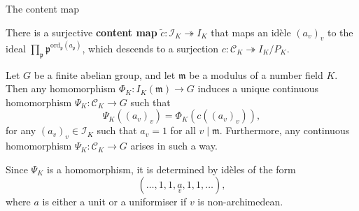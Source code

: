 \documentclass[10pt]{beamer}
\begin{document}
\begin{frame}[t]{The content map}

There is a surjective \textbf{content map} $ \widetilde{c} : \mathcal{I}_K \twoheadrightarrow I_K $ that maps an id\`ele $ (a_v)_v $ to the ideal $ \prod_\mathfrak{p} \mathfrak{p}^{\mathrm{ord}_\mathfrak{p}(a_\mathfrak{p})} $, which descends to a surjection $ c : \mathcal{C}_K \twoheadrightarrow I_K / P_K $.

\pause

\begin{lemma}
Let $ G $ be a finite abelian group, and let $ \mathfrak{m} $ be a modulus of a number field $ K $. Then any homomorphism $ \Phi_K : I_K(\mathfrak{m}) \to G $ induces a unique continuous homomorphism $ \Psi_K : \mathcal{C}_K \to G $ such that
$$ \Psi_K((a_v)_v) = \Phi_K(c((a_v)_v)), $$
for any $ (a_v)_v \in \mathcal{I}_K $ such that $ a_v = 1 $ for all $ v \mid \mathfrak{m} $. \pause Furthermore, any continuous homomorphism $ \Psi_K : \mathcal{C}_K \to G $ arises in such a way.
\end{lemma}

\pause

Since $ \Psi_K $ is a homomorphism, it is determined by id\`eles of the form
$$ (\dots, 1, 1, \underset{v}{a}, 1, 1, \dots), $$
where $ a $ is either a unit or a uniformiser if $ v $ is non-archimedean.

\end{frame}
\end{document}

